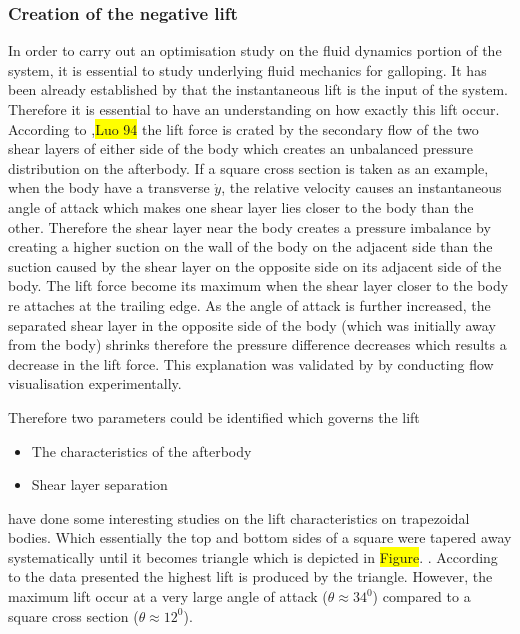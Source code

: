 \documentclass{article}
\newcommand{\hilight}[1]{\colorbox{yellow}{#1}}
\begin{document}
\subsubsection{Creation of the negative lift}

In order to carry out an optimisation study on the fluid dynamics portion of the system, it is essential to study underlying fluid mechanics for galloping. It has been already established by \cite{Parkinson1964} that the instantaneous lift is the input of the system. Therefore it is essential to have an understanding on how exactly this lift occur. According to \cite{Parkinson1989},\hilight{Luo 94} the lift force is crated by the secondary flow of the two shear layers of either side of the body which creates an unbalanced pressure distribution on the afterbody. If a square cross section is taken as an example, when the body have a transverse $\dot{y}$, the relative velocity causes an instantaneous angle of attack which makes one shear layer lies closer to the body than the other. Therefore the shear layer near the body creates a pressure imbalance by creating a higher suction on the wall of the body on the adjacent side than the suction caused by the shear layer on the opposite side on its adjacent side of the body. The lift force become its maximum when the shear layer closer to the body re attaches at the trailing edge. As the angle of attack is further increased, the separated shear layer in the opposite side of the body (which was initially away from the body) shrinks therefore the pressure difference decreases which results a decrease in the lift force. This explanation was validated by \cite{Luo1994} by conducting flow visualisation experimentally.

Therefore two parameters could be identified which governs the lift 

\begin{itemize}
\item{ The characteristics of the afterbody}
\item{Shear layer separation}
\end{itemize}
 
\cite{Luo1994} have done some interesting studies on the lift characteristics on trapezoidal bodies. Which essentially the top and bottom sides of a square were tapered away systematically until it becomes triangle which is depicted in \hilight{Figure}.
. According to the data presented \cite{Luo1994} the highest lift is produced by the triangle. However, the maximum lift occur at a very large angle of attack ($\theta\approx 34^0 $) compared to a square cross section ($\theta\approx 12^0 $).
\end{document}
